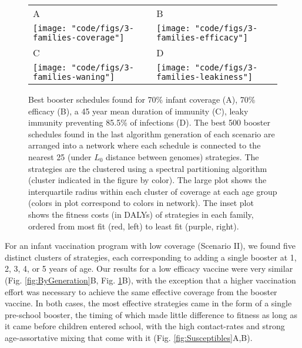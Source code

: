 \documentclass[12pt]{article}
\begin{document}
\begin{figure}[h!]
\begin{tabular}{ll}
A&B\\
\texttt{[image: "code/figs/3-families-coverage"]}
&
\texttt{[image: "code/figs/3-families-efficacy"]}  \\
C&D\\
\texttt{[image: "code/figs/3-families-waning"]} &
\texttt{[image: "code/figs/3-families-leakiness"]}\\
\end{tabular}

\caption{\footnotesize Best booster schedules found for 
70\% infant coverage (A), 70\% efficacy (B),
a 45 year mean duration of immunity (C),  
leaky immunity preventing 85.5\% of infections (D).
The best 500 booster schedules found in the last algorithm generation of each scenario are arranged into a network
where each schedule is connected to the nearest 25 (under $L_0$ distance between genomes) strategies.
The strategies are the clustered using a spectral partitioning algorithm (cluster indicated in the figure by color).
The large plot shows the interquartile radius within each cluster of coverage at each age group (colors
in plot correspond to colors in network). The inset plot shows the fitness costs (in DALYs) of strategies in each family,
ordered from most fit (red, left) to least fit (purple, right).
}

\label{fig:Best}
\end{figure}



For an infant vaccination program with low coverage (Scenario II), we found five distinct clusters of strategies,
each corresponding to adding a single booster at 1, 2, 3, 4, or 5 years of age.
Our results for a low efficacy vaccine were very similar (Fig. \ref{fig:ByGeneration}B, Fig. \ref{fig:Best}B),
with the exception that a higher vaccination effort was necessary to achieve the same effective 
coverage from the booster vaccine.
In both cases, the most effective strategies came in the form of a single pre-school booster,
the timing of which made little difference to fitness as long as it came before 
children entered school, with the high contact-rates and strong age-assortative mixing
that come with it (Fig. \ref{fig:Susceptibles}A,B).
\end{document}
